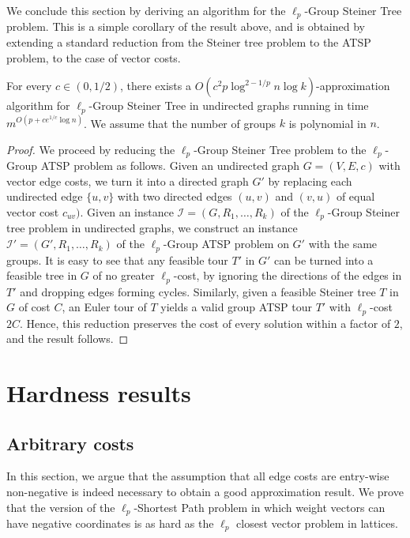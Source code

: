 \documentclass[11pt,a4paper]{article}
\begin{document}
We conclude this section by deriving an algorithm for the $\ell_p$-Group Steiner Tree problem. This is a simple corollary of the result above, and is obtained by extending a standard reduction from the Steiner tree problem to the ATSP problem, to the case of vector costs.
\begin{theorem}
    For every $c\in (0,1/2)$, there exists a $O(c^2 p  \log^{2-1/p} n \log k)$-approximation algorithm for
    $\ell_p$-Group Steiner Tree in undirected graphs running in time $m^{O(p + c e^{1/c} \log n)}$. We assume that the number of groups $k$ is polynomial in $n$. 
\end{theorem}
\begin{proof}
    We proceed by reducing the $\ell_p$-Group Steiner Tree problem to the $\ell_p$-Group ATSP problem as follows. Given an undirected graph $G=(V,E,c)$ with vector edge costs, we turn it into a directed graph $G'$ by replacing each undirected edge $\{u,v\}$ with two directed edges $(u,v)$ and $(v,u)$ of equal vector cost $c_{uv})$. Given an instance $\mathcal{I} = (G,R_1, \dots , R_k)$ of the $\ell_p$-Group Steiner tree problem in undirected graphs, we construct an instance $\mathcal{I}' = (G', R_1, \dots , R_k)$ of the $\ell_p$-Group ATSP problem on \(G'\) with the same groups. It is easy to see that any feasible tour $T'$ in $G'$ can be turned into a feasible tree in $G$ of no greater $\ell_p$-cost, by ignoring the directions of the edges in $T'$ and dropping edges forming cycles.
    Similarly, given a feasible Steiner tree $T$ in $G$ of cost $C$, an Euler tour of $T$ yields a valid group ATSP tour $T'$ with $\ell_p$-cost $2C$. Hence, this reduction preserves the cost of every solution within a factor of $2$, and the result follows.
\end{proof}

\section{Hardness results}\label{sec:all-hardness-results}
\subsection{Arbitrary costs}\label{sec:hardness-from-CVP}
In this section, we argue that the assumption that all edge costs are entry-wise non-negative is %
indeed necessary to obtain a good approximation result. We prove that the version of the $\ell_p$-Shortest Path problem in which weight vectors can have negative coordinates is as hard as the $\ell_p$ closest vector problem in lattices.
\end{document}
